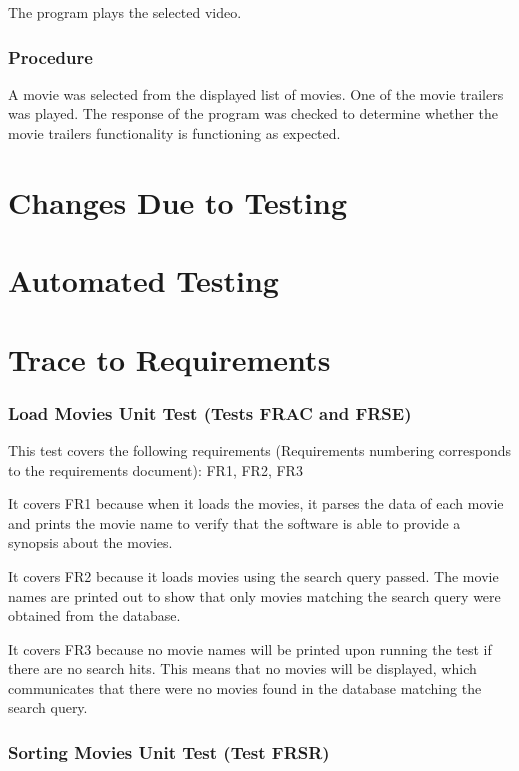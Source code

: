 \documentclass[12pt, titlepage]{article}
\begin{document}
The program plays the selected video.

\subsubsection{Procedure}

A movie was selected from the displayed list of movies. One of the movie trailers was played. The response of the program was checked to determine whether the movie trailers functionality is functioning as expected.  

\section{Changes Due to Testing}

\section{Automated Testing}
		
\section{Trace to Requirements}
\subsubsection{Load Movies Unit Test (Tests FRAC and FRSE)}

This test covers the following requirements (Requirements numbering corresponds to the requirements document): FR1, FR2, FR3

It covers FR1 because when it loads the movies, it parses the data of each movie and prints the movie name to verify that the software is able to provide a synopsis about the movies. 

It covers FR2 because it loads movies using the search query passed. The movie names are printed out to show that only movies matching the search query were obtained from the database.

It covers FR3 because no movie names will be printed upon running the test if there are no search hits. This means that no movies will be displayed, which communicates that there were no movies found in the database matching the search query. 

\subsubsection{Sorting Movies Unit Test (Test FRSR)}
\end{document}
